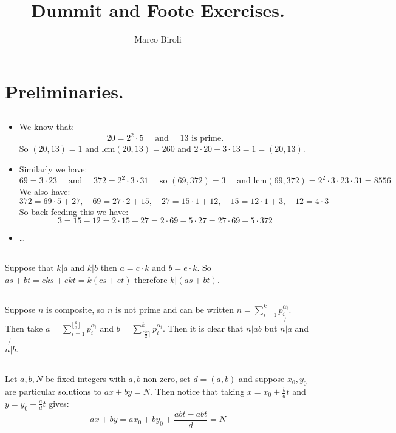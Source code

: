 \documentclass[10pt,a4paper]{book}
\author{Marco Biroli}
\title{Dummit and Foote Exercises.}
\newcommand{\lcm}{\text{lcm}}
\begin{document}
\maketitle
\chapter{Preliminaries.}
\section{}
\begin{itemize}
\item We know that:
\[
20 = 2^2 \cdot 5 \quad \text{ and } \quad 13 \text{ is prime.}
\]
So $(20, 13) = 1$ and $\lcm(20,13) = 260$ and $2\cdot 20 - 3 \cdot 13 = 1 = (20, 13)$.
\item Similarly we have:
\[
69 = 3 \cdot 23 \quad \text{ and } \quad 372 = 2^2 \cdot 3 \cdot 31 \quad \text{ so } (69, 372) = 3 \quad \text{ and } \lcm(69, 372) = 2^2 \cdot 3 \cdot 23 \cdot 31 = 8556
\]
We also have:
\[
372 = 69 \cdot 5 + 27, \quad 69 = 27 \cdot 2 + 15, \quad 27 = 15 \cdot 1 + 12, \quad 15 = 12\cdot 1 + 3, \quad 12 = 4 \cdot 3
\]
So back-feeding this we have:
\[
3 = 15 - 12 = 2\cdot 15 - 27 = 2 \cdot 69 - 5 \cdot 27 = 27 \cdot 69 - 5 \cdot 372
\]
\item \ldots
\end{itemize}
\section{}
Suppose that $k | a$ and $k | b$ then $a = c \cdot k$ and $b = e \cdot k$. So $as + bt = c k s + e k t = k (cs + et)$ therefore $k | (as + bt)$.
\section{}
Suppose $n$ is composite, so $n$ is not prime and can be written $n = \sum_{i = 1}^k p_i^{\alpha_i}$. Then take $a = \sum_{i = 1}^{\lfloor \frac{k}{2} \rfloor} p_i^{\alpha_i}$ and $b = \sum_{\lceil \frac{k}{2} \rceil}^k p_i^{\alpha_i}$. Then it is clear that $n | ab$ but $n \not{|} a$ and $n \not{|} b$.
\section{}
Let $a,b, N$ be fixed integers with $a, b$ non-zero, set $d= (a,b)$ and suppose $x_0, y_0$ are particular solutions to $ax + by = N$. Then notice that taking $x = x_0 + \frac{b}{d} t$ and $y = y_0 - \frac{a}{d}t$ gives:
\[
ax + by = ax_0 + by_0 + \frac{abt - abt}{d} = N
\]
\end{document}
